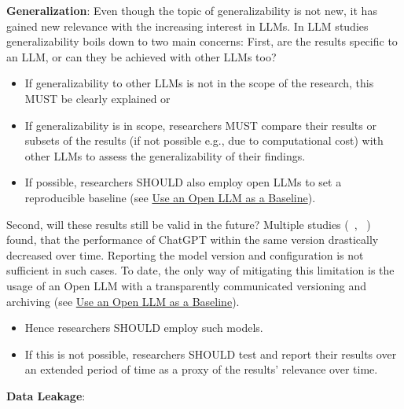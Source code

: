 \begin{itemize}
\textbf{Generalization}:
Even though the topic of generalizability is not new, it has gained new relevance with the increasing interest in LLMs. In LLM studies generalizability boils down to two main concerns: 
First, are the results specific to an LLM, or can they be achieved with other LLMs too? 
\begin{itemize}
  \item If generalizability to other LLMs is not in the scope of the research, this MUST be clearly explained or
  \item If generalizability is in scope, researchers MUST compare their results or subsets of the results (if not possible e.g., due to computational cost) with other LLMs to assess the generalizability of their findings. 
  \item If possible, researchers SHOULD also employ open LLMs to set a reproducible baseline (see \href{/guidelines/#use-open-llm}{Use an Open LLM as a Baseline}).
\end{itemize}
Second, will these results still be valid in the future? Multiple studies (~\cite{DBLP:journals/corr/abs-2307-09009}, ~\cite{doi:10.1148/radiol.232411}) found, that the performance of ChatGPT within the same version drastically decreased over time. Reporting the model version and configuration is not sufficient in such cases. To date, the only way of mitigating this limitation is the usage of an Open LLM with a transparently communicated versioning and archiving (see \href{/guidelines/#use-open-llm}{Use an Open LLM as a Baseline}). 
\begin{itemize}
  \item Hence researchers SHOULD employ such models. 
  \item If this is not possible, researchers SHOULD test and report their results over an extended period of time as a proxy of the results' relevance over time.
\end{itemize}

\textbf{Data Leakage}:



\end{itemize}
